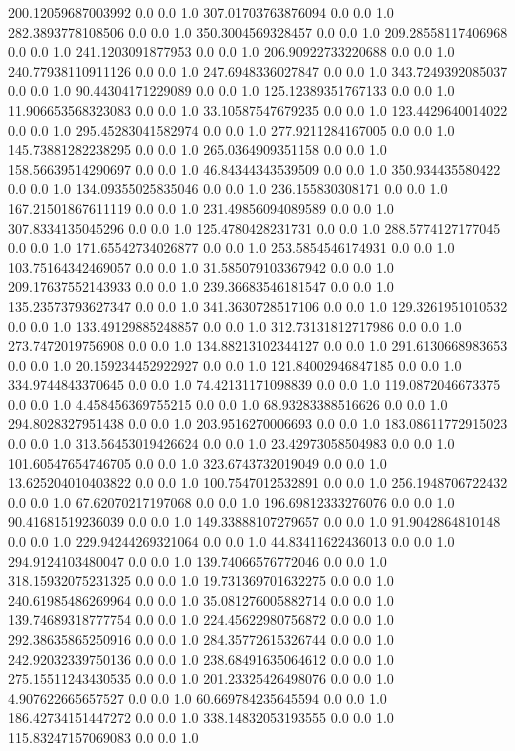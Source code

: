 200.12059687003992	0.0	0.0	1.0
307.01703763876094	0.0	0.0	1.0
282.3893778108506	0.0	0.0	1.0
350.3004569328457	0.0	0.0	1.0
209.28558117406968	0.0	0.0	1.0
241.1203091877953	0.0	0.0	1.0
206.90922733220688	0.0	0.0	1.0
240.77938110911126	0.0	0.0	1.0
247.6948336027847	0.0	0.0	1.0
343.7249392085037	0.0	0.0	1.0
90.44304171229089	0.0	0.0	1.0
125.12389351767133	0.0	0.0	1.0
11.906653568323083	0.0	0.0	1.0
33.10587547679235	0.0	0.0	1.0
123.4429640014022	0.0	0.0	1.0
295.45283041582974	0.0	0.0	1.0
277.9211284167005	0.0	0.0	1.0
145.73881282238295	0.0	0.0	1.0
265.0364909351158	0.0	0.0	1.0
158.56639514290697	0.0	0.0	1.0
46.84344343539509	0.0	0.0	1.0
350.934435580422	0.0	0.0	1.0
134.09355025835046	0.0	0.0	1.0
236.155830308171	0.0	0.0	1.0
167.21501867611119	0.0	0.0	1.0
231.49856094089589	0.0	0.0	1.0
307.8334135045296	0.0	0.0	1.0
125.4780428231731	0.0	0.0	1.0
288.5774127177045	0.0	0.0	1.0
171.65542734026877	0.0	0.0	1.0
253.5854546174931	0.0	0.0	1.0
103.75164342469057	0.0	0.0	1.0
31.585079103367942	0.0	0.0	1.0
209.17637552143933	0.0	0.0	1.0
239.36683546181547	0.0	0.0	1.0
135.23573793627347	0.0	0.0	1.0
341.3630728517106	0.0	0.0	1.0
129.3261951010532	0.0	0.0	1.0
133.49129885248857	0.0	0.0	1.0
312.73131812717986	0.0	0.0	1.0
273.7472019756908	0.0	0.0	1.0
134.88213102344127	0.0	0.0	1.0
291.6130668983653	0.0	0.0	1.0
20.159234452922927	0.0	0.0	1.0
121.84002946847185	0.0	0.0	1.0
334.9744843370645	0.0	0.0	1.0
74.42131171098839	0.0	0.0	1.0
119.0872046673375	0.0	0.0	1.0
4.458456369755215	0.0	0.0	1.0
68.93283388516626	0.0	0.0	1.0
294.8028327951438	0.0	0.0	1.0
203.9516270006693	0.0	0.0	1.0
183.08611772915023	0.0	0.0	1.0
313.56453019426624	0.0	0.0	1.0
23.42973058504983	0.0	0.0	1.0
101.60547654746705	0.0	0.0	1.0
323.6743732019049	0.0	0.0	1.0
13.625204010403822	0.0	0.0	1.0
100.7547012532891	0.0	0.0	1.0
256.1948706722432	0.0	0.0	1.0
67.62070217197068	0.0	0.0	1.0
196.69812333276076	0.0	0.0	1.0
90.41681519236039	0.0	0.0	1.0
149.33888107279657	0.0	0.0	1.0
91.9042864810148	0.0	0.0	1.0
229.94244269321064	0.0	0.0	1.0
44.83411622436013	0.0	0.0	1.0
294.9124103480047	0.0	0.0	1.0
139.74066576772046	0.0	0.0	1.0
318.15932075231325	0.0	0.0	1.0
19.731369701632275	0.0	0.0	1.0
240.61985486269964	0.0	0.0	1.0
35.081276005882714	0.0	0.0	1.0
139.74689318777754	0.0	0.0	1.0
224.45622980756872	0.0	0.0	1.0
292.38635865250916	0.0	0.0	1.0
284.35772615326744	0.0	0.0	1.0
242.92032339750136	0.0	0.0	1.0
238.68491635064612	0.0	0.0	1.0
275.15511243430535	0.0	0.0	1.0
201.23325426498076	0.0	0.0	1.0
4.907622665657527	0.0	0.0	1.0
60.669784235645594	0.0	0.0	1.0
186.42734151447272	0.0	0.0	1.0
338.14832053193555	0.0	0.0	1.0
115.83247157069083	0.0	0.0	1.0
